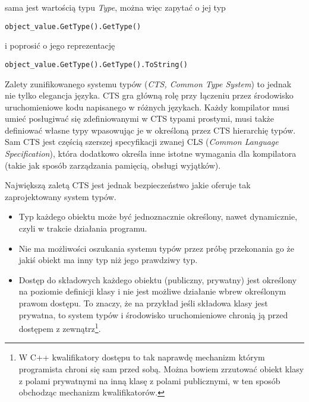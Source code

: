 sama jest wartością typu {\em Type}, można więc zapytać o jej typ

\begin{scriptsize}
\begin{verbatim}
object_value.GetType().GetType()
\end{verbatim}
\end{scriptsize}

i poprosić o jego reprezentację 

\begin{scriptsize}
\begin{verbatim}
object_value.GetType().GetType().ToString()
\end{verbatim}
\end{scriptsize}

Zalety zunifikowanego systemu typów ({\em CTS, Common Type System}) to jednak nie tylko elegancja języka.
CTS gra główną rolę przy łączeniu przez środowisko uruchomieniowe kodu napisanego w różnych językach. 
Każdy kompilator musi umieć posługiwać się zdefiniowanymi w CTS typami prostymi, musi także 
definiować własne typy wpasowując je w określoną przez CTS hierarchię typów. Sam CTS jest częścią
szerszej specyfikacji zwanej CLS ({\em Common Language Specification}), która dodatkowo określa 
inne istotne wymagania dla kompilatora (takie jak sposób zarządzania pamięcią, obsługi wyjątków). 

Największą zaletą CTS jest jednak bezpieczeństwo jakie oferuje tak zaprojektowany system typów.
\begin{itemize}
\item{Typ każdego obiektu może być jednoznacznie określony, nawet dynamicznie, czyli w trakcie działania programu.}
\item{Nie ma możliwości oszukania systemu typów przez próbę przekonania go że jakiś obiekt ma inny typ
niż jego prawdziwy typ.}
\item Dostęp do składowych każdego obiektu (publiczny, prywatny) jest określony na poziomie definicji klasy i 
nie jest możliwe działanie wbrew określonym prawom dostępu. To znaczy, że na przykład jeśli składowa klasy 
jest prywatna, to system typów i środowisko uruchomieniowe chronią ją przed dostępem z 
zewnątrz\footnote{W C++ kwalifikatory dostępu to tak naprawdę mechanizm którym programista chroni się
sam przed sobą. Można bowiem zrzutować obiekt klasy z polami prywatnymi na inną klasę z polami publicznymi, w
ten sposób obchodząc mechanizm kwalifikatorów.}.  
\end{itemize}

